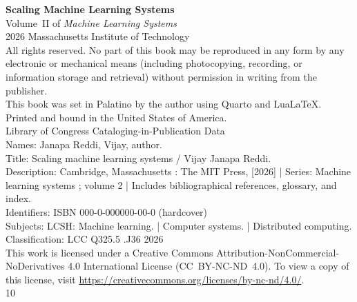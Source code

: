 \null\vfill
\begin{flushleft}
\thispagestyle{empty}

{\large\bfseries Scaling Machine Learning Systems}\\[0.5em]
{\normalsize Volume~II of \textit{Machine Learning Systems}}\\[1.5em]

\textcopyright{} 2026 Massachusetts Institute of Technology\\[0.5em]

All rights reserved. No part of this book may be reproduced in any form by any electronic or mechanical means (including photocopying, recording, or information storage and retrieval) without permission in writing from the publisher.\\[1em]

This book was set in Palatino by the author using Quarto and Lua\LaTeX.\\[0.5em]

Printed and bound in the United States of America.\\[1em]

Library of Congress Cataloging-in-Publication Data\\[0.25em]
Names: Janapa Reddi, Vijay, author.\\
Title: Scaling machine learning systems / Vijay Janapa Reddi.\\
Description: Cambridge, Massachusetts : The MIT Press, [2026] | Series: Machine learning systems ; volume 2 | Includes bibliographical references, glossary, and index.\\
Identifiers: ISBN 000-0-000000-00-0 (hardcover)\\
Subjects: LCSH: Machine learning. | Computer systems. | Distributed computing.\\
Classification: LCC Q325.5 .J36 2026\\[1em]

This work is licensed under a Creative Commons Attribution-NonCommercial-NoDerivatives 4.0 International License (CC~BY-NC-ND~4.0). To view a copy of this license, visit \url{https://creativecommons.org/licenses/by-nc-nd/4.0/}.\\[1em]

10

\end{flushleft}
